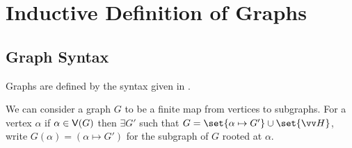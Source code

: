 \section{Inductive Definition of Graphs}

\subsection{Graph Syntax}
Graphs are defined by the syntax given in .





We can consider a graph $G$ to be a finite
map from vertices to subgraphs. For a vertex $\alpha$ if $\alpha \in \textup{\textsf{V}}(G)$
then $\exists G'$ such that $G = \set{\alpha \mapsto G'} \cup \set{\seq{H}}$, write $G(\alpha) = (\alpha \mapsto G')$ for
the subgraph of $G$ rooted at $\alpha$.

